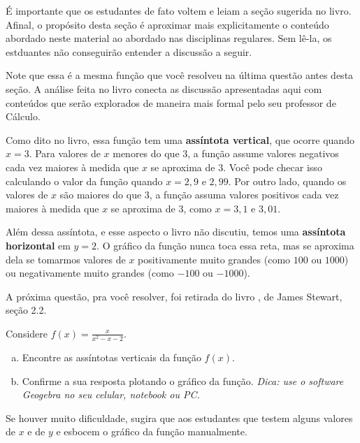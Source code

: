 \documentclass[main_estudante.tex]{subfiles}
\begin{document}
\paraTutores

É importante que os estudantes de fato voltem e leiam a seção sugerida no livro. Afinal, o propósito desta seção é aproximar mais explicitamente o conteúdo abordado neste material ao abordado nas disciplinas regulares. Sem lê-la, os estduantes não conseguirão entender a discussão a seguir.

\paraAmbos

Note que essa é a mesma função que você resolveu na última questão antes desta seção. A análise feita no livro conecta as discussão apresentadas aqui com conteúdos que serão explorados de maneira mais formal pelo seu professor de Cálculo.

Como dito no livro, essa função tem uma \textbf{assíntota vertical}, que ocorre quando $x=3$. Para valores de $x$ menores do que 3, a função assume valores negativos cada vez maiores à medida que $x$ se aproxima de $3$. Você pode checar isso calculando o valor da função quando $x=2,9$ e $2,99$. Por outro lado, quando os valores de $x$ são maiores do que $3$, a função assuma valores positivos cada vez maiores à medida que $x$ se aproxima de $3$, como $x=3,1$ e $3,01$.

Além dessa assíntota, e esse aspecto o livro não discutiu, temos uma \textbf{assíntota horizontal} em $y=2$. O gráfico da função nunca toca essa reta, mas se aproxima dela se tomarmos valores de $x$ positivamente muito grandes (como $100$ ou $1000$) ou negativamente muito grandes (como $-100$ ou $-1000$).

A próxima questão, pra você resolver, foi retirada do livro , de James Stewart, seção 2.2.

\begin{resolva}
Considere $f(x)=\frac{x}{x^2-x-2}$.
\begin{enumerate}[a)]
 \item Encontre as assíntotas verticais da função $f(x)$.
 \item Confirme a sua resposta plotando o gráfico da função. \textit{Dica: use o software Geogebra no seu celular, notebook ou PC.}
\end{enumerate}
\end{resolva}

\paraTutores

Se houver muito dificuldade, sugira que aos estudantes que testem alguns valores de $x$ e de $y$ e esbocem o gráfico da função manualmente.
\end{document}
